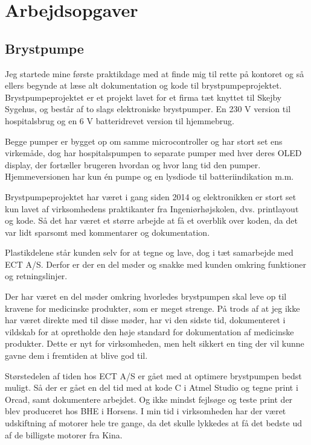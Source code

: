 \chapter{Arbejdsopgaver}

\section{Brystpumpe}

Jeg startede mine første praktikdage med at finde mig til rette på kontoret og så ellers begynde at læse alt dokumentation og kode til brystpumpeprojektet. Brystpumpeprojektet er et projekt lavet for et firma tæt knyttet til Skejby Sygehus, og består af to slags elektroniske brystpumper. En 230 V version til hospitalsbrug og en 6 V batteridrevet version til hjemmebrug. 

Begge pumper er bygget op om samme microcontroller og har stort set ens virkemåde, dog har hospitalspumpen to separate pumper med hver deres OLED display, der fortæller brugeren hvordan og hvor lang tid den pumper. Hjemmeversionen har kun én pumpe og en lysdiode til batteriindikation m.m.

Brystpumpeprojektet har været i gang siden 2014 og elektronikken er stort set kun lavet af virksomhedens praktikanter fra Ingeniørhøjskolen, dvs. printlayout og kode. Så det har været et større arbejde at få et overblik over koden, da det var lidt sparsomt med kommentarer og dokumentation.

Plastikdelene står kunden selv for at tegne og lave, dog i tæt samarbejde med ECT A/S. Derfor er der en del møder og snakke med kunden omkring funktioner og retningslinjer.

Der har været en del møder omkring hvorledes brystpumpen skal leve op til kravene for medicinske produkter, som er meget strenge. På trods af at jeg ikke har været direkte med til disse møder, har vi den sidste tid, dokumenteret i vildskab for at opretholde den høje standard for dokumentation af medicinske produkter. Dette er nyt for virksomheden, men helt sikkert en ting der vil kunne gavne dem i fremtiden at blive god til.

Størstedelen af tiden hos ECT A/S er gået med at optimere brystpumpen bedst muligt. Så der er gået en del tid med at kode C i Atmel Studio og tegne print i Orcad, samt dokumentere arbejdet. Og ikke mindst fejlsøge og teste print der blev produceret hos BHE i Horsens. I min tid i virksomheden har der været udskiftning af motorer hele tre gange, da det skulle lykkedes at få det bedste ud af de billigste motorer fra Kina.


